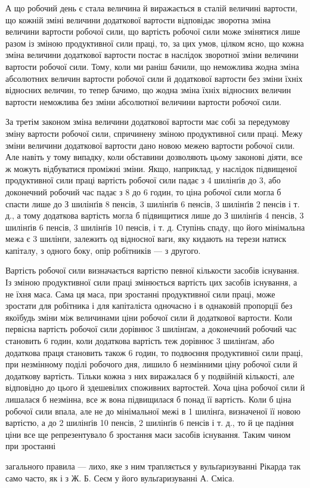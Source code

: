 А що робочий день є стала величина й виражається в сталій
величині вартости, що кожній зміні величини додаткової вартости
відповідає зворотна зміна величини вартости робочої сили, що
вартість робочої сили може змінятися лише разом із зміною продуктивної
сили праці, то, за цих умов, цілком ясно, що кожна
зміна величини додаткової вартости постає в наслідок зворотної
зміни величини вартости робочої сили. Тому, коли ми раніш
бачили, що неможлива жодна зміна абсолютних величин вартости
робочої сили й додаткової вартости без зміни їхніх відносних
величин, то тепер бачимо, що жодна зміна їхніх відносних
величин вартости неможлива без зміни абсолютної величини вартости
робочої сили.

За третім законом зміна величини додаткової вартости має
собі за передумову зміну вартости робочої сили, спричинену
зміною продуктивної сили праці. Межу зміни величини додаткової
вартости дано новою межею вартости робочої сили. Але навіть
у тому випадку, коли обставини дозволяють цьому законові
діяти, все ж можуть відбуватися проміжні зміни. Якщо, наприклад,
у наслідок підвищеної продуктивної сили праці вартість
робочої сили падає з 4 шилінґів до 3, або доконечний робочий час
падає з 8 до 6 годин, то ціна робочої сили могла б спасти лише до
З шилінґів 8 пенсів, 3 шилінґів 6 пенсів, 3 шилінґів 2 пенсів
і т. д., а тому додаткова вартість могла б підвищитися лише до
З шилінґів 4 пенсів, 3 шилінґів 6 пенсів, 3 шилінґів 10 пенсів,
і т. д. Ступінь спаду, що його мінімальна межа є 3 шилінґи,
залежить од відносної ваги, яку кидають на терези натиск капіталу,
з одного боку, опір робітників — з другого.

Вартість робочої сили визначається вартістю певної кількости
засобів існування. Із зміною продуктивної сили праці змінюється
вартість цих засобів існування, а не їхня маса. Сама ця
маса, при зростанні продуктивної сили праці, може зростати для
робітника і для капіталіста одночасно і в однаковій пропорції
без якоїбудь зміни між величинами ціни робочої сили й додаткової
вартости. Коли первісна вартість робочої сили дорівнює 3 шилінґам,
а доконечний робочий час становить 6 годин, коли додаткова
вартість теж дорівнює 3 шилінґам, або додаткова праця
становить також 6 годин, то подвоєння продуктивної сили праці,
при незмінному поділі робочого дня, лишило б незмінними ціну
робочої сили й додаткову вартість. Тільки кожна з них виражалася
б у подвійній кількості, але відповідно до цього й здешевілих
споживних вартостей. Хоча ціна робочої сили й лишалася б
незмінна, все ж вона підвищилася б понад її вартість. Коли б
ціна робочої сили впала, але не до мінімальної межі в 1 шилінґа,
визначеної її новою вартістю, а до 2 шилінґів 10 пенсів, 2 шилінґів
6 пенсів і т. д., то й це падіння ціни все ще репрезентувало б
зростання маси засобів існування. Таким чином при зростанні

загального правила — лихо, яке з ним трапляється у вульґаризуванні
Рікарда так само часто, як і з Ж. Б. Сеєм у його вульґаризуванні А. Сміса.
